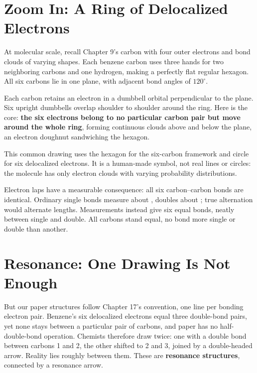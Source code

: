 \section{Zoom In: A Ring of Delocalized Electrons}

At molecular scale, recall Chapter 9's carbon with four outer electrons and bond clouds of varying shapes. Each benzene carbon uses three hands for two neighboring carbons and one hydrogen, making a perfectly flat regular hexagon. All six carbons lie in one plane, with adjacent bond angles of $120^{\circ}$.

Each carbon retains an electron in a dumbbell orbital perpendicular to the plane. Six upright dumbbells overlap shoulder to shoulder around the ring. Here is the core: \textbf{the six electrons belong to no particular carbon pair but move around the whole ring}, forming continuous clouds above and below the plane, an electron doughnut sandwiching the hexagon.

\begin{center}
\end{center}

This common drawing uses the hexagon for the six-carbon framework and circle for six delocalized electrons. It is a human-made symbol, not real lines or circles: the molecule has only electron clouds with varying probability distributions.

Electron laps have a measurable consequence: all six carbon--carbon bonds are identical. Ordinary single bonds measure about , doubles about ; true alternation would alternate lengths. Measurements instead give six equal  bonds, neatly between single and double. All carbons stand equal, no bond more single or double than another.

\section{Resonance: One Drawing Is Not Enough}

But our paper structures follow Chapter 17's convention, one line per bonding electron pair. Benzene's six delocalized electrons equal three double-bond pairs, yet none stays between a particular pair of carbons, and paper has no half-double-bond operation. Chemists therefore draw twice: one with a double bond between carbons 1 and 2, the other shifted to 2 and 3, joined by a double-headed arrow. Reality lies roughly between them. These are \textbf{resonance structures}, connected by a resonance arrow.

